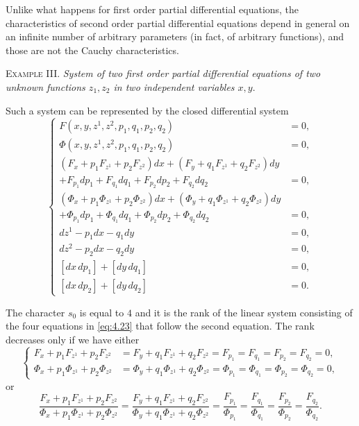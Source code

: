 \documentclass[leqno,11pt]{book}
\numberwithin{equation}{chapter}
\theoremstyle{shape1}
\theoremstyle{shape0}
\theoremstyle{shape2}
\theoremstyle{definition}
\begin{document}
Unlike what happens for first order partial differential equations, the characteristics of second order partial differential equations depend in general on an infinite number of arbitrary parameters (in fact, of arbitrary functions), and those are not the Cauchy characteristics. 

\vspace{12pt}\fsec \textsc{Example III.} \emph{System of two first order partial differential equations of two unknown functions $z_{1}, z_{2}$ in two independent variables $x,y$}.

Such a system can be represented by the closed differential system
\begin{equation}
  \label{eq:4.23}
  \left\{
    \begin{aligned}
      F(x,y,z^{1},z^{2},p_{1},q_{1},p_{2},q_{2})&=0,\\
      \Phi(x,y,z^{1},z^{2},p_{1},q_{1},p_{2},q_{2})&=0,\\
      (F_{x}+p_{1}F_{z^{1}}+p_{2}F_{z^{2}})dx+(F_{y}+q_{1}F_{z^{1}}+q_{2}F_{z^{2}})dy\\
      +F_{p_{1}}dp_{1}+F_{q_{1}}dq_{1}+F_{p_{2}}dp_{2}+F_{q_{2}}dq_{2}&=0,\\
      (\Phi_{x}+p_{1}\Phi_{z^{1}}+p_{2}\Phi_{z^{2}})dx+(\Phi_{y}+q_{1}\Phi_{z^{1}}+q_{2}\Phi_{z^{2}})dy\\
      +\Phi_{p_{1}}dp_{1}+\Phi_{q_{1}}dq_{1}+\Phi_{p_{2}}dp_{2}+\Phi_{q_{2}}dq_{2}&=0,\\
      dz^{1}-p_{1}dx-q_{1}dy&=0,\\
      dz^{2}-p_{2}dx-q_{2}dy&=0,\\
      [dx\,dp_{1}]+[dy\,dq_{1}]&=0,\\
      [dx\,dp_{2}]+[dy\,dq_{2}]&=0.
    \end{aligned}
  \right.
\end{equation}

The character $s_{0}$ is equal to $4$ and it is the rank of the linear system consisting of the four equations in \eqref{eq:4.23} that follow the second equation. The rank decreases only if we have either
\begin{equation}
  \label{eq:4.24}
  \left\{
    \begin{aligned}
      F_{x}+p_{1}F_{z^{1}}+p_{2}F_{z^{2}}&=F_{y}+q_{1}F_{z^{1}}+q_{2}F_{z^{2}}=F_{p_{1}}=F_{q_{1}}=F_{p_{2}}=F_{q_{2}}=0,\\
      \Phi_{x}+p_{1}\Phi_{z^{1}}+p_{2}\Phi_{z^{2}}&=\Phi_{y}+q_{1}\Phi_{z^{1}}+q_{2}\Phi_{z^{2}}=\Phi_{p_{1}}=\Phi_{q_{1}}=\Phi_{p_{2}}=\Phi_{q_{2}}=0,
    \end{aligned}
  \right.
\end{equation}
or
\begin{equation}
  \label{eq:4.25}
  \frac{F_{x}+p_{1}F_{z^{1}}+p_{2}F_{z^{2}}}{\Phi_{x}+p_{1}\Phi_{z^{1}}+p_{2}\Phi_{z^{2}}}=\frac{F_{y}+q_{1}F_{z^{1}}+q_{2}F_{z^{2}}}{\Phi_{y}+q_{1}\Phi_{z^{1}}+q_{2}\Phi_{z^{2}}}=\frac{F_{p_{1}}}{\Phi_{p_{1}}}=\frac{F_{q_{1}}}{\Phi_{q_{1}}}=\frac{F_{p_{2}}}{\Phi_{p_{2}}}=\frac{F_{q_{2}}}{\Phi_{q_{2}}}.
\end{equation}
\end{document}
